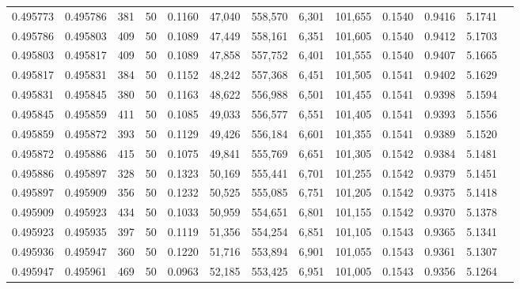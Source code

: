 \begin{tabular}{rrrrrrrrrrrrr}
0.495773 & 0.495786 & 381 &  50 &                                     0.1160 &  47,040 & 558,570 &   6,301 & 101,655 & 0.1540 & 0.9416 & 5.1741 \\
0.495786 & 0.495803 & 409 &  50 &                                     0.1089 &  47,449 & 558,161 &   6,351 & 101,605 & 0.1540 & 0.9412 & 5.1703 \\
0.495803 & 0.495817 & 409 &  50 &                                     0.1089 &  47,858 & 557,752 &   6,401 & 101,555 & 0.1540 & 0.9407 & 5.1665 \\
0.495817 & 0.495831 & 384 &  50 &                                     0.1152 &  48,242 & 557,368 &   6,451 & 101,505 & 0.1541 & 0.9402 & 5.1629 \\
0.495831 & 0.495845 & 380 &  50 &                                     0.1163 &  48,622 & 556,988 &   6,501 & 101,455 & 0.1541 & 0.9398 & 5.1594 \\
0.495845 & 0.495859 & 411 &  50 &                                     0.1085 &  49,033 & 556,577 &   6,551 & 101,405 & 0.1541 & 0.9393 & 5.1556 \\
0.495859 & 0.495872 & 393 &  50 &                                     0.1129 &  49,426 & 556,184 &   6,601 & 101,355 & 0.1541 & 0.9389 & 5.1520 \\
0.495872 & 0.495886 & 415 &  50 &                                     0.1075 &  49,841 & 555,769 &   6,651 & 101,305 & 0.1542 & 0.9384 & 5.1481 \\
0.495886 & 0.495897 & 328 &  50 &                                     0.1323 &  50,169 & 555,441 &   6,701 & 101,255 & 0.1542 & 0.9379 & 5.1451 \\
0.495897 & 0.495909 & 356 &  50 &                                     0.1232 &  50,525 & 555,085 &   6,751 & 101,205 & 0.1542 & 0.9375 & 5.1418 \\
0.495909 & 0.495923 & 434 &  50 &                                     0.1033 &  50,959 & 554,651 &   6,801 & 101,155 & 0.1542 & 0.9370 & 5.1378 \\
0.495923 & 0.495935 & 397 &  50 &                                     0.1119 &  51,356 & 554,254 &   6,851 & 101,105 & 0.1543 & 0.9365 & 5.1341 \\
0.495936 & 0.495947 & 360 &  50 &                                     0.1220 &  51,716 & 553,894 &   6,901 & 101,055 & 0.1543 & 0.9361 & 5.1307 \\
0.495947 & 0.495961 & 469 &  50 &                                     0.0963 &  52,185 & 553,425 &   6,951 & 101,005 & 0.1543 & 0.9356 & 5.1264 \\

\end{tabular}
